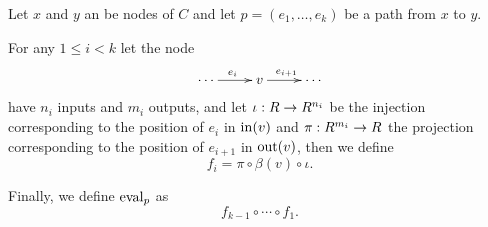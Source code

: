 \begin{definition}
  Let $x$ and $y$ an be nodes of $C$ and let $p=(e_1,\ldots,e_k)$ be a
  path from $x$ to $y$.

  For any $1\le i<k$ let the node
  \[\xymatrix{\cdots\ar[r]^{e_i}&v\ar[r]^{e_{i+1}}&\cdots}\]
  have $n_i$ inputs and $m_i$ outputs, and let $\iota:R\rightarrow R^{n_i}$ be
  the injection corresponding to the position of $e_i$ in $\operatorname{in}(v)$
  and $\pi:R^{m_i}\rightarrow R$ the projection corresponding to the position
  of $e_{i+1}$ in $\operatorname{out}(v)$, then we define
  \begin{equation}
    \label{eq:252}
    f_i = \pi\circ\beta(v)\circ\iota
    \text{.}
  \end{equation}

  Finally, we define $\operatorname{eval}_p$ as
  \begin{equation}
    \label{eq:247}
    f_{k-1}\circ\cdots\circ f_1
    \text{.}
  \end{equation}
\end{definition}

